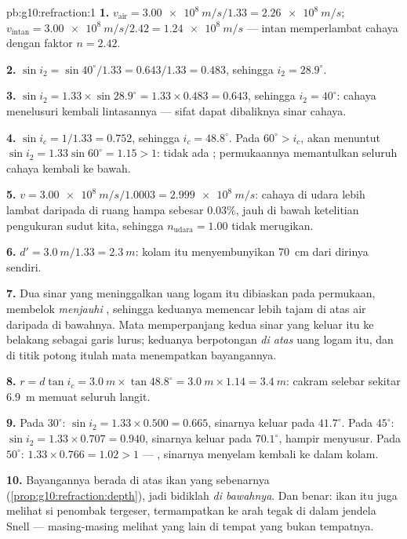 \begin{solution}{pb:g10:refraction:1}
\textbf{1.} $v_{\text{air}} = \qty{3.00e8}{m/s}/1.33 =
\qty{2.26e8}{m/s}$; $v_{\text{intan}} = \qty{3.00e8}{m/s}/2.42 =
\qty{1.24e8}{m/s}$ --- intan memperlambat cahaya dengan faktor
$n = 2.42$.

\textbf{2.} $\sin i_2 = \sin 40^\circ / 1.33 = 0.643/1.33 = 0.483$,
sehingga $i_2 = 28.9^\circ$.

\textbf{3.} $\sin i_2 = 1.33 \times \sin 28.9^\circ = 1.33 \times
0.483 = 0.643$, sehingga $i_2 = 40^\circ$: cahaya menelusuri kembali
lintasannya --- sifat dapat dibaliknya sinar cahaya.

\textbf{4.} $\sin i_c = 1/1.33 = 0.752$, sehingga $i_c = 48.8^\circ$.
Pada $60^\circ > i_c$,  akan menuntut $\sin i_2 = 1.33 \sin
60^\circ = 1.15 > 1$: tidak ada ; permukaannya memantulkan
seluruh cahaya kembali ke bawah.

\textbf{5.} $v = \qty{3.00e8}{m/s}/1.0003 = \qty{2.999e8}{m/s}$: cahaya
di udara lebih lambat daripada di ruang hampa sebesar $0.03\%$, jauh di
bawah ketelitian pengukuran sudut kita, sehingga
$n_{\text{udara}} = 1.00$ tidak merugikan.

\textbf{6.} $d' = \qty{3.0}{m}/1.33 = \qty{2.3}{m}$: kolam itu
menyembunyikan \qty{70}{cm} dari dirinya sendiri.

\textbf{7.} Dua sinar yang meninggalkan uang logam itu dibiaskan pada
permukaan, membelok \emph{menjauhi} , sehingga keduanya
memencar lebih tajam di atas air daripada di bawahnya. Mata
memperpanjang kedua sinar yang keluar itu ke belakang sebagai garis
lurus; keduanya berpotongan \emph{di atas} uang logam itu, dan di
titik potong itulah mata menempatkan bayangannya.

\textbf{8.} $r = d \tan i_c = \qty{3.0}{m} \times \tan 48.8^\circ =
\qty{3.0}{m} \times 1.14 = \qty{3.4}{m}$: cakram selebar sekitar
\qty{6.9}{m} memuat seluruh langit.

\textbf{9.} Pada $30^\circ$: $\sin i_2 = 1.33 \times 0.500 = 0.665$,
sinarnya keluar pada $41.7^\circ$. Pada $45^\circ$: $\sin i_2 = 1.33 \times
0.707 = 0.940$, sinarnya keluar pada $70.1^\circ$, hampir
menyusur. Pada $50^\circ$: $1.33 \times 0.766 = 1.02 > 1$ ---
, sinarnya menyelam kembali ke dalam kolam.

\textbf{10.} Bayangannya berada di atas ikan yang sebenarnya
(\cref{prop:g10:refraction:depth}), jadi bidiklah \emph{di bawahnya}.
Dan benar: ikan itu juga melihat si penombak tergeser, termampatkan ke
arah tegak di dalam jendela Snell --- masing-masing melihat yang lain
di tempat yang bukan tempatnya.


\end{solution}
